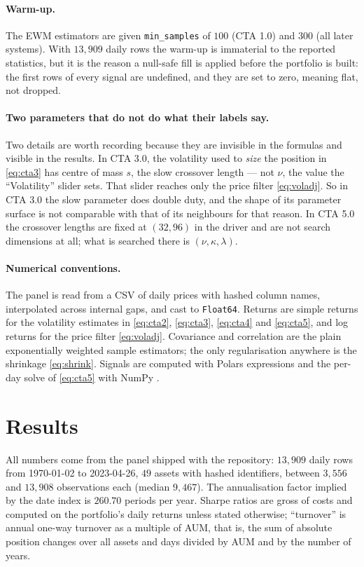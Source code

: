 \documentclass[11pt,a4paper]{article}
\newcommand{\code}[1]{\texttt{#1}}
\begin{document}
\paragraph{Warm-up.}
The EWM estimators are given \code{min\_samples} of $100$ (CTA 1.0) and $300$
(all later systems). With $13{,}909$ daily rows the warm-up is immaterial to
the reported statistics, but it is the reason a null-safe fill is applied
before the portfolio is built: the first rows of every signal are undefined,
and they are set to zero, meaning flat, not dropped.

\paragraph{Two parameters that do not do what their labels say.}
Two details are worth recording because they are invisible in the formulas and
visible in the results. In CTA 3.0, the volatility used to \emph{size} the
position in \eqref{eq:cta3} has centre of mass $s$, the slow crossover length
--- not $\nu$, the value the ``Volatility'' slider sets. That slider reaches
only the price filter \eqref{eq:voladj}. So in CTA 3.0 the slow parameter does
double duty, and the shape of its parameter surface is not comparable with
that of its neighbours for that reason. In CTA 5.0 the crossover lengths are
fixed at $(32, 96)$ in the driver and are not search dimensions at all; what
is searched there is $(\nu, \kappa, \lambda)$.

\paragraph{Numerical conventions.}
The panel is read from a CSV of daily prices with hashed column names,
interpolated across internal gaps, and cast to \code{Float64}. Returns are
simple returns for the volatility estimates in \eqref{eq:cta2},
\eqref{eq:cta3}, \eqref{eq:cta4} and \eqref{eq:cta5}, and log returns for the
price filter \eqref{eq:voladj}. Covariance and correlation are the plain
exponentially weighted sample estimators; the only regularisation anywhere is
the shrinkage \eqref{eq:shrink}. Signals are computed with
Polars \citep{polars} expressions and the per-day solve of \eqref{eq:cta5}
with NumPy \citep{harris2020}.

\section{Results}
\label{sec:results}

All numbers come from the panel shipped with the repository:
$13{,}909$ daily rows from 1970-01-02 to 2023-04-26, $49$ assets with hashed
identifiers, between $3{,}556$ and $13{,}908$ observations each (median
$9{,}467$). The annualisation factor implied by the date index is
$260.70$ periods per year. Sharpe ratios are gross of costs and computed on
the portfolio's daily returns unless stated otherwise; ``turnover'' is annual
one-way turnover as a multiple of AUM, that is, the sum of absolute position
changes over all assets and days divided by AUM and by the number of years.
\end{document}
